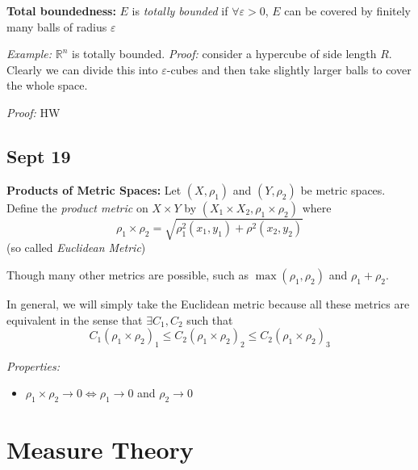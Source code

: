 \documentclass[12pt]{report}
\newcommand{\R}{\mathbb{R}}
\newcommand{\ep}{\varepsilon}
\newcommand{\sub}{\subseteq}
\newenvironment*{tbox}[2][gray]{
    \begin{tcolorbox}[
        parbox=false,
        colback=#1!5!white,
        colframe=#1!75!black,
        breakable,
        title={#2}
    ]}
    {\end{tcolorbox}}
\begin{document}
    \textbf{Total boundedness:} $E$ is \emph{totally bounded} if $\forall \ep > 0$, $E$ can be covered by finitely many balls of radius $\ep$

    \emph{Example:} $\R^n$ is totally bounded. \emph{Proof:} consider a hypercube of side length $R$. Clearly we can divide this into $\ep$-cubes and then take slightly larger balls to cover the whole space.

    \begin{tbox}{\textbf{Theorem (Characterization of Compactness):} The following are equivalent: 
        \begin{enumerate}
            \item $E$ is complete and totally bounded
            \item Every sequence in $E$ has a convergent subsequence with its limit in $E$
            \item If $\{V_{\alpha}\}_{\alpha \in A}$ is an open cover of $E$, then there exists a finite set $F \sub A$ such that $\{U_{\alpha}\}_{\alpha \in F}$ covers $E$
        \end{enumerate}}
        \emph{Proof:} HW
    \end{tbox}

\section{Sept 19}
    \textbf{Products of Metric Spaces:} Let $(X, \rho_1)$ and $(Y, \rho_2)$ be metric spaces. Define the \emph{product metric} on $X \times Y$ by $(X_1 \times X_2, \rho_1 \times \rho_2)$ where
    \[\rho_1 \times \rho_2 = \sqrt{\rho_1^2(x_1, y_1) + \rho^2(x_2, y_2)}\]
    (so called \emph{Euclidean Metric})

    Though many other metrics are possible, such as $\max(\rho_1, \rho_2)$ and $\rho_1 + \rho_2$. 

    In general, we will simply take the Euclidean metric because all these metrics are equivalent in the sense that $\exists C_1, C_2$ such that 
    \[C_1(\rho_1 \times \rho_2)_1 \leq C_2(\rho_1 \times \rho_2)_2 \leq C_2(\rho_1 \times \rho_2)_3\]

    \emph{Properties:}
    \begin{itemize}
        \item $\rho_1 \times \rho_2 \to 0 \iff \rho_1 \to 0$ and $\rho_2 \to 0$
    \end{itemize}

\chapter{Measure Theory}
\end{document}
